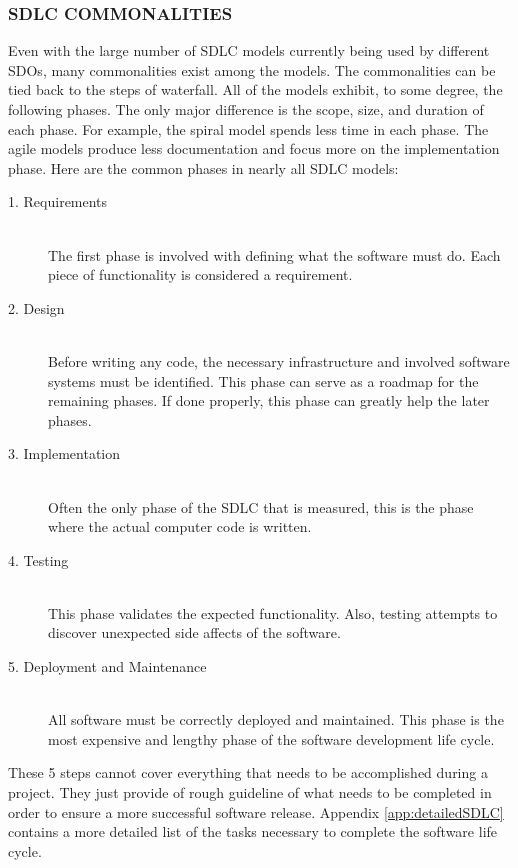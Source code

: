 \documentclass[SDSUThesis.tex]{subfiles}
\begin{document}
    \subsubsection{SDLC COMMONALITIES}
        Even with the large number of SDLC models currently being used by different SDOs,
        many commonalities exist among the models.  The 
        commonalities can be tied back to the steps of waterfall.  All of the models
        exhibit, to some degree, the following phases. The only major difference is 
        the scope, size, and duration of each phase.  For example, the spiral
        model spends less time in each phase.  The agile models produce less
        documentation and focus more on the implementation phase. Here are
        the common phases in nearly all SDLC models:
        \begin{description}
            \item[1. Requirements] \hfill \\ The first phase is involved 
                with defining what the software must do.  Each piece of 
                functionality is considered a requirement.  
            \item[2. Design] \hfill \\ Before writing any code, the 
                necessary infrastructure and involved software systems
                must be identified. This phase can serve as a roadmap for the 
                remaining phases. If done properly, this phase can greatly 
                help the later phases.
            \item[3. Implementation] \hfill \\ Often the only phase of the SDLC 
                that is measured, this is the phase where the actual computer
                code is written.
            \item[4. Testing] \hfill \\ This phase validates the expected 
                functionality.  Also, testing attempts to discover unexpected
                side affects of the software.
            \item[5. Deployment and Maintenance] \hfill \\ All software must 
                be correctly deployed and maintained.  This phase is the 
                most expensive and lengthy phase of the software
                development life cycle.
        \end{description}
        
        These 5 steps cannot cover everything that needs to be accomplished
        during a project.  They just provide of rough guideline of what needs
        to be completed in order to ensure a more successful software release.
        Appendix \ref{app:detailedSDLC} contains a more detailed list of the
        tasks necessary to complete the software life cycle.
        
\end{document}
